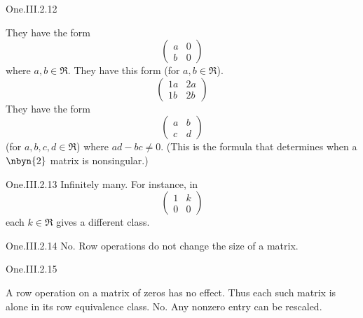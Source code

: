 \begin{ans}{One.III.2.12}
      \begin{exparts}
        \partsitem They have the form
          \begin{equation*}
            \begin{pmatrix}
              a  &0  \\
              b  &0
            \end{pmatrix}
          \end{equation*}
          where \( a,b\in\Re \).
        \partsitem They have this form (for \( a,b\in\Re \)).
          \begin{equation*}
            \begin{pmatrix}
             1a  &2a \\
             1b  &2b
            \end{pmatrix}
          \end{equation*}
        \partsitem They have the form
          \begin{equation*}
            \begin{pmatrix}
              a  &b  \\
              c  &d
            \end{pmatrix}
          \end{equation*}
          (for \( a,b,c,d\in\Re \)) where \( ad-bc\neq 0 \).
          (This is the formula that determines when a \( \nbyn{2} \) matrix
          is nonsingular.)
      \end{exparts}
    
\end{ans}
\begin{ans}{One.III.2.13}
       Infinitely many.
       For instance, in
       \begin{equation*}
         \begin{pmatrix}
           1  &k  \\
           0  &0
         \end{pmatrix}
       \end{equation*}
       each $k\in\Re$ gives a different class.
    
\end{ans}
\begin{ans}{One.III.2.14}
      No.
      Row operations do not change the size of a matrix.
    
\end{ans}
\begin{ans}{One.III.2.15}
     \begin{exparts}
      \partsitem A row operation on a matrix of zeros has no effect.
        Thus each such matrix is alone in its row equivalence class.
      \partsitem No.
        Any nonzero entry can be rescaled.
     \end{exparts}
    
\end{ans}
